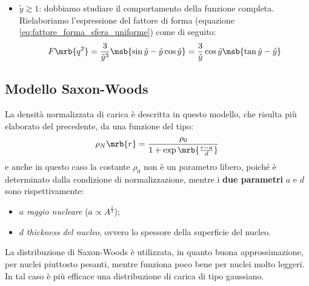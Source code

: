 \begin{itemize}
	\item $\tilde{y} \gtrsim 1$:
	      dobbiamo studiare il comportamento della funzione completa. Rielaboriamo
	      l'espressione del fattore di forma (equazione
	      \ref{eq:fattore_forma_sfera_uniforme}) come di seguito:
	      \begin{equation}
		      F\mrb{q^2} = \frac{3}{\tilde{y}^3}\msb{\sin\tilde{y} -
			      \tilde{y}\cos\tilde{y}} = \frac{3}{\tilde{y}} \cos\tilde{y}
		      \msb{\tan\tilde{y} - \tilde{y}}
	      \end{equation}
\end{itemize}

\subsection{Modello Saxon-Woods}
La densità normalizzata di carica è descritta in questo modello, che risulta
più elaborato del precedente, da una funzione del tipo:
\begin{equation}
	\rho_N\mrb{r} = \frac{\rho_0}{1 + \exp\mrb{\frac{r-a}{d}}}
\end{equation}
e anche in questo caso la costante $\rho_0$ non è un parametro libero, poiché è
determinato dalla condizione di normalizzazione, mentre i \textbf{due
	parametri} $a$ e $d$ sono rispettivamente:
\begin{itemize}
	\item $a$ \textit{raggio nucleare} ($a \propto A ^{\frac{1}{3}}$);
	\item $d$ \textit{thickness del nucleo}, ovvero lo spessore della superficie
	      del nucleo.
\end{itemize}

\begin{note}
	La distribuzione di Saxon-Woods è utilizzata, in quanto buona
	approssimazione, per nuclei piuttosto pesanti, mentre funziona poco bene per
	nuclei molto leggeri. In tal caso è più efficace una distribuzione di carica
	di tipo gaussiano.
\end{note}

